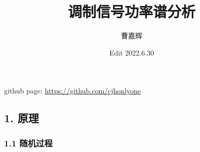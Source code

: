 \documentclass[
]{article}
\title{\huge \textbf{调制信号功率谱分析}}
\author{曹嘉辉}
\date{Edit 2022.6.30}
\begin{document}
\maketitle

github page: \url{https://github.com/cjhonlyone}

\tableofcontents

\newpage
\hypertarget{header-n3}{%
\subsection{1. 原理}\label{header-n3}}

\hypertarget{header-n4}{%
\subsubsection{1.1 随机过程}\label{header-n4}}
\end{document}
